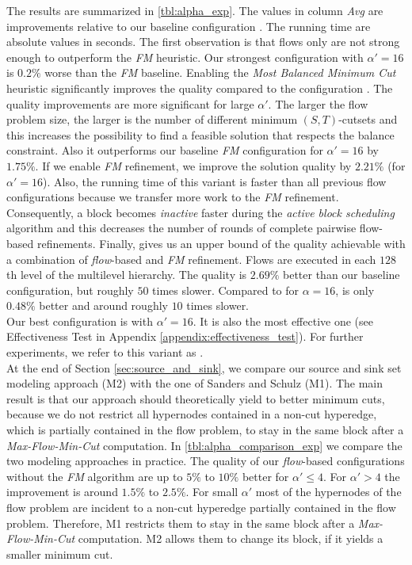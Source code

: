 The results are summarized in \autoref{tbl:alpha_exp}. The values
in column \emph{Avg} are improvements
relative to our baseline configuration \FlowVariant{-}{-}{+}. The running
time are absolute values in seconds. The first observation is that flows
only are not strong enough to outperform the
\emph{FM} heuristic. Our strongest configuration with $\alpha' = 16$
is $0.2\%$ worse than the \emph{FM} baseline. 
Enabling the \emph{Most Balanced Minimum Cut} heuristic significantly improves the
quality compared to the configuration \FlowVariant{+}{-}{-}.
The quality improvements are more significant for large
$\alpha'$. The larger the flow problem size, the larger is the number of different minimum 
$(S,T)$-cutsets and this increases the possibility to find a feasible solution that respects the 
balance constraint. Also it outperforms our baseline \emph{FM} 
configuration for $\alpha' = 16$ by $1.75\%$.
If we enable \emph{FM} refinement, we improve the solution
quality by $2.21\%$ (for $\alpha' = 16$). Also, the running time of this variant is faster
than all previous flow configurations because we transfer more work to the \emph{FM} refinement.
Consequently, a block becomes \emph{inactive} faster during the \emph{active block 
scheduling} algorithm and this decreases the number of rounds of complete pairwise 
flow-based refinements. 
Finally,  gives us an upper bound of the quality
achievable with a combination of \emph{flow}-based and \emph{FM} refinement. Flows are executed 
in each $128$th level of the multilevel hierarchy. The quality is $2.69\%$ better than our
baseline configuration, but roughly $50$ times slower. Compared to \FlowVariant{+}{+}{+} for 
$\alpha = 16$,  is only $0.48\%$ better and around roughly $10$ times slower.\\
Our best configuration is \FlowVariant{+}{+}{+} with $\alpha' = 16$. 
It is also the most effective one (see Effectiveness Test in Appendix \ref{appendix:effectiveness_test}). 
For further experiments, we refer to this variant as . \\
At the end of Section \ref{sec:source_and_sink}, we compare our source and sink set modeling
approach (\textsc{M2}) with the one of Sanders and Schulz \cite{sanders2011engineering} (\textsc{M1}). The main result is
that our approach should theoretically yield to better minimum cuts, because we do not restrict
all hypernodes contained in a non-cut hyperedge, which is partially contained in the flow problem,
to stay in the same block after a \emph{Max-Flow-Min-Cut} computation. In \autoref{tbl:alpha_comparison_exp}
we compare the two modeling approaches in practice. The quality of our \emph{flow}-based
configurations without the \emph{FM} algorithm are up to $5\%$ to $10\%$ better for 
$\alpha' \le 4$. For $\alpha' > 4$ the improvement is around $1.5\%$ to $2.5\%$. For small
$\alpha'$ most of the hypernodes of the flow problem are incident to a non-cut hyperedge partially
contained in the flow problem. Therefore, \textsc{M1} restricts them to stay in the same block
after a \emph{Max-Flow-Min-Cut} computation. \textsc{M2} allows them to change its block, if 
it yields a smaller minimum cut.

